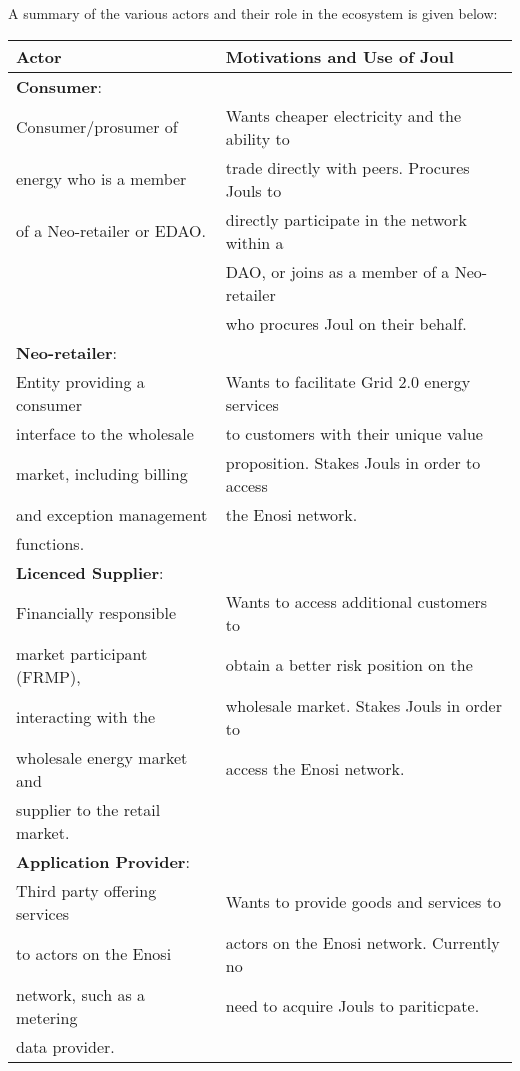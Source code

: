 \documentclass{article}
\newcommand{\head}[1]{\textnormal{\textbf{#1}}}
\theoremstyle{definition}
\theoremstyle{plain} %
\begin{document}
A summary of the various actors and their role in the ecosystem is given below:\\


\begin{tabular}{|l|l|}
 \hline 	
 \head{Actor} & \head{Motivations and Use of Joul}\\
 \hline 
 \hline
 
 \textbf{Consumer}:				& \\
 \hline 
 Consumer/prosumer of 	 		& Wants cheaper electricity and the ability to	\\
 energy who is a member  		& trade directly with peers. Procures Jouls to	\\
 of a Neo-retailer or EDAO.		& directly participate in the network within a	\\
  								& DAO, or joins as a member of a Neo-retailer	\\
 								& who procures Joul on their behalf. 			\\
 \hline

 \textbf{Neo-retailer}:			& \\
 \hline
 Entity providing a consumer	& Wants to facilitate Grid 2.0 energy services	\\
 interface to the wholesale 	& to customers with their unique value 			\\
 market, including billing 		& proposition. Stakes Jouls in order to access 	\\
 and exception management 		& the Enosi network.							\\
 functions. 					& \\ 
 \hline 
 
 \textbf{Licenced Supplier}:	& \\ 
 \hline
 Financially responsible 		& Wants to access additional customers to 		\\
 market participant (FRMP), 	& obtain a better risk position on the			\\
 interacting with the 			& wholesale market. Stakes Jouls in order to 	\\
 wholesale energy market and 	& access the Enosi network.						\\
 supplier to the retail market.	& \\
 \hline 
 
 \textbf{Application Provider}:	& \\
 \hline 
 Third party offering services	& Wants to provide goods and services to 		\\
 to actors on the Enosi 		& actors on the Enosi network. Currently no 	\\
 network, such as a metering	& need to acquire Jouls to pariticpate.			\\
 data provider.					& \\
 \hline
 

\end{tabular}
\end{document}
